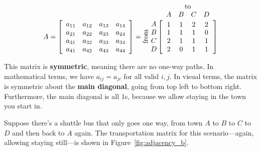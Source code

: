 \documentclass[../gatm.tex]{subfiles}
\begin{document}
$$
  A = \left[\begin{array}{cccc}
  a_{11} & a_{12} & a_{13} & a_{14} \\
a_{21} & a_{22} & a_{23} & a_{24} \\
a_{31} & a_{32} & a_{33} & a_{34} \\
a_{41} & a_{42} & a_{43} & a_{44} \\
  \end{array}\right] =
  \rotatebox[origin=c]{90}{from}\;\,
  \begin{array}{@{}c@{}}
    \rowind{A} \\ \rowind{B} \\ \rowind{C} \\ \rowind{D}
  \end{array}
  \mathop{\left[
  \begin{array}{cccc}
     \colind{1}{A}  &  \colind{1}{B}  &  \colind{2}{C}  & \colind{2}{D} \\
1 & 1 & 1 & 0 \\
2 & 1 & 1 & 1 \\
2 & 0 & 1 & 1 \\
  \end{array}
  \right]}^{
  \begin{array}{@{}c@{}}
    \rowind{\text{to}} \\ \mathstrut
  \end{array}
  }
$$

This matrix is \textbf{symmetric}, meaning there are no one-way paths. In mathematical terms, we have $a_{ij}=a_{ji}$ for all valid $i,j$. In visual terms, the matrix is symmetric about the \textbf{main diagonal}, going from top left to bottom right. Furthermore, the main diagonal is all $1$s, because we allow staying in the town you start in.

Suppose there's a shuttle bus that only goes one way, from town $A$ to $B$ to $C$ to $D$ and then back to $A$ again. The transportation matrix for this scenario---again, allowing staying still---is shown in Figure~\ref{fig:adjacency_b}.
\end{document}
